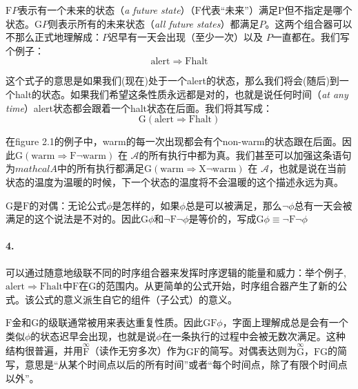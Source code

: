 \documentclass{book}
\begin{document}
    $\mathrm{F}P$表示有一个未来的状态（{\itshape a future state}）（$\mathrm{F}$代表“未来”）满足P但不指定是哪个状态。$\mathrm{G}P$则表示所有的未来状态（{\itshape all future states}）都满足$P$。这两个组合器可以不那么正式地理解成：$P$迟早有一天会出现（至少一次）以及 $P$一直都在。我们写个例子：
    \begin{equation*}
      \text{alert} \Rightarrow \mathrm{F} \text{halt}
    \end{equation*}

    这个式子的意思是如果我们(现在)处于一个alert的状态，那么我们将会(随后)到一个halt的状态。如果我们希望这条性质永远都是对的，也就是说任何时间（{\itshape at any time}）alert状态都会跟着一个halt状态在后面。我们将其写成：
    \begin{equation*}
      \mathrm{G}(\text{alert} \Rightarrow \mathrm{F} \text{halt})
    \end{equation*}

    在figure 2.1的例子中，warm的每一次出现都会有个non-warm的状态跟在后面。因此$\mathrm{G}(\text{warm} \Rightarrow \mathrm{F} \neg \text{warm})$ 在 $\mathcal{A}$的所有执行中都为真。我们甚至可以加强这条语句为$mathcal{A}$中的所有执行都满足$\mathrm{G}(\text{warm} \Rightarrow \mathrm{X} \neg \text{warm})$ 在 $\mathcal{A}$，也就是说在当前状态的温度为温暖的时候，下一个状态的温度将不会温暖的这个描述永远为真。

    $\mathrm{G}$是$\mathrm{F}$的对偶：无论公式$\phi$是怎样的，如果$\phi$总是可以被满足，那么$\neg\phi$总有一天会被满足的这个说法是不对的。因此$\mathrm{G}\phi$和$\neg \mathrm{F}\neg\phi$是等价的，写成$\mathrm{G}\phi \equiv \neg \mathrm{F}\neg\phi$

    \paragraph{4.} 可以通过随意地级联不同的时序组合器来发挥时序逻辑的能量和威力：举个例子,$\text{alert} \Rightarrow \mathrm{F} \text{halt}$中$\mathrm{F}$在$\mathrm{G}$的范围内。从更简单的公式开始，时序组合器产生了新的公式。该公式的意义派生自它的组件（子公式）的意义。

    $\mathrm{F}$金和$\mathrm{G}$的级联通常被用来表达重复性质。因此$\mathrm{G}\mathrm{F}\phi$，字面上理解成总是会有一个类似$\phi$的状态迟早会出现，也就是说$\phi$在一条执行的过程中会被无数次满足。这种结构很普遍，并用$\overset{\infty}{\mathrm{F}}$（读作无穷多次）作为$\mathrm{G}\mathrm{F}$的简写。对偶表达则为$\overset{\infty}{\mathrm{G}}$，$\mathrm{F}\mathrm{G}$的简写，意思是“从某个时间点以后的所有时间”或者“每个时间点，除了有限个时间点以外”。
\end{document}
